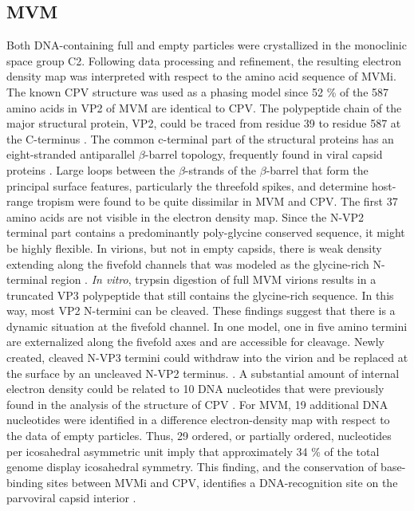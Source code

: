 







\subsection{MVM}

Both DNA-containing full and empty particles were crystallized in the monoclinic space group C2. Following data processing and refinement, the resulting electron density map was interpreted with respect to the amino acid sequence of MVMi. The known CPV structure was used as a phasing model since 52 \% of the 587 amino acids in VP2 of MVM are identical to CPV. The polypeptide chain of the major structural protein, VP2, could be traced from residue 39 to residue 587 at the C-terminus \cite{pmid15299974}.     
The common c-terminal part of the structural proteins has an eight-stranded antiparallel $\beta$-barrel topology, frequently found in viral capsid proteins \cite{pmid2673017}. Large loops between the $\beta$-strands of the $\beta$-barrel that form the principal surface features, particularly the threefold spikes, and determine host-range tropism were found to be quite dissimilar in MVM and CPV. 
The first 37 amino acids are not visible in the electron density map. Since the N-VP2 terminal part contains a predominantly poly-glycine conserved sequence, it might be highly flexible. In virions, but not in empty capsids, there is weak density extending along the fivefold channels that was modeled as the glycine-rich N-terminal region \cite{pmid15299494, pmid8969301}. \textit{In vitro}, trypsin digestion of full MVM virions results in a truncated VP3 polypeptide that still contains the glycine-rich sequence. In this way, most VP2 N-termini can be cleaved. These findings suggest that there is a dynamic situation at the fivefold channel. In one model, one in five amino termini are externalized along the fivefold axes and are accessible for cleavage. Newly created, cleaved N-VP3 termini could withdraw into the virion and be replaced at the surface by an uncleaved N-VP2 terminus. \cite{pmid8503170, pmid9817841}.
A substantial amount of internal electron density could be related to 10 DNA nucleotides that were previously found in the analysis of the structure of CPV \cite{pmid7735832, pmid1616694}. For MVM, 19 additional DNA nucleotides were identified in a difference electron-density map with respect to the data of empty particles. Thus, 29 ordered, or partially ordered, nucleotides per icosahedral asymmetric unit imply that approximately 34 \% of the total genome display icosahedral symmetry. This finding, and the conservation of base-binding sites between MVMi and CPV, identifies a DNA-recognition site on the parvoviral capsid interior \cite{pmid9817841}.    










